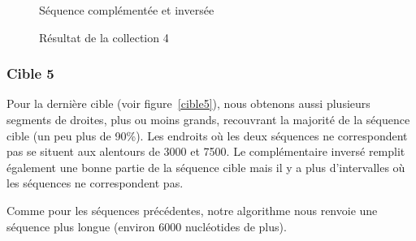 \begin{figure}[!ht]
\begin{minipage}[c]{.46 \linewidth}
\begin{center}
			 Séquence complémentée et inversée
		\end{center}
	\end{minipage}
	\caption{Résultat de la collection 4}
	\label{cible4}
\end{figure}

\FloatBarrier

\subsubsection*{Cible 5}


Pour la dernière cible (voir figure~\ref{cible5}), nous obtenons aussi plusieurs segments de droites,
plus ou moins grands, recouvrant la majorité de la séquence cible (un peu plus
de 90\%). Les endroits où les deux séquences ne correspondent pas se situent aux
alentours de 3000 et 7500. Le complémentaire inversé remplit également une bonne
partie de la séquence cible mais il y a plus d'intervalles où les séquences ne
correspondent pas.

Comme pour les séquences précédentes, notre algorithme nous renvoie une séquence
plus longue (environ 6000 nucléotides de plus).

